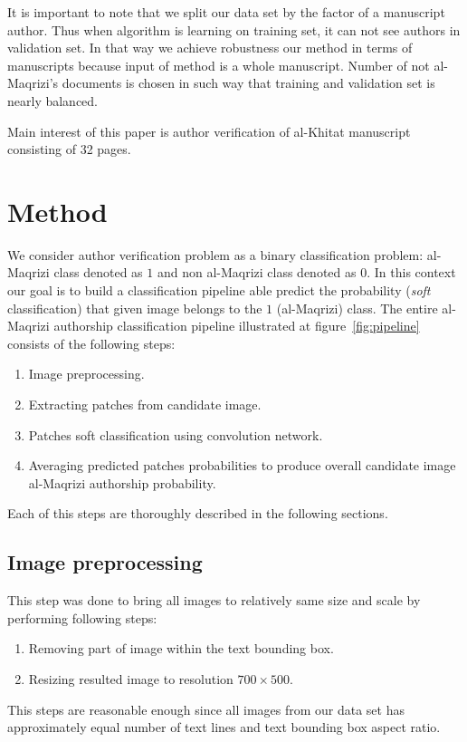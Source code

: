 \documentclass[conference,a4paper,twocolumn]{IEEEtran}
\newcommand{\convnet}{ConvNet~} %
\begin{document}
It is important to note that we split our data set by the factor of a manuscript author. Thus when algorithm is learning on training set, it can not see authors in validation set. In that way we achieve robustness our method in terms of manuscripts because input of method is a whole manuscript. Number of not al-Maqrizi's documents is chosen in such way that training and validation set is nearly balanced.

Main interest of this paper is author verification of al-Khitat manuscript consisting of 32 pages.



\section{Method}
\label{sec:the_method}

We consider author verification problem as a binary classification problem: al-Maqrizi class denoted as $1$ and non al-Maqrizi class denoted as $0$. In this context our goal is to build a classification pipeline able predict the probability (\textit{soft} classification) that given image belongs to the $1$ (al-Maqrizi) class. The entire al-Maqrizi authorship classification pipeline illustrated at figure~\ref{fig:pipeline} consists of the following steps:

\begin{enumerate}[start=0]
	\item Image preprocessing.
	\item Extracting patches from candidate image.
	\item Patches soft classification using convolution network.
	\item Averaging predicted patches probabilities to produce overall candidate image al-Maqrizi authorship probability.
\end{enumerate}

Each of this steps are thoroughly described in the following sections.	



\subsection{Image preprocessing}
This step was done to bring all images to relatively same size and scale by performing following steps:
\begin{enumerate}
	\item Removing part of image within the text bounding box.
	\item Resizing resulted image to resolution $700\times 500$.
\end{enumerate}
This steps are reasonable enough since all images from our data set has approximately equal number of text lines and text bounding box aspect ratio. 
\end{document}

